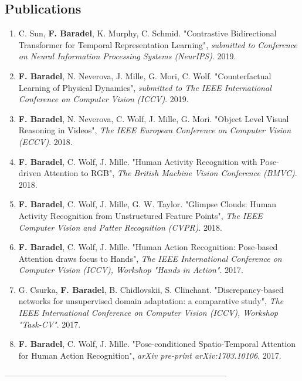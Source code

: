 \documentclass[10pt]{res} %
\begin{document}
\begin{resume}
\section{\large Publications} 
\begin{enumerate}[wide=0pt]
	\item C. Sun, \textbf{F. Baradel}, K. Murphy, C. Schmid. "Contrastive Bidirectional Transformer for Temporal Representation Learning", \textit{submitted to Conference on Neural Information Processing Systems (NeurIPS)}. 2019.
	\item \textbf{F. Baradel}, N. Neverova, J. Mille, G. Mori, C. Wolf. "Counterfactual Learning of Physical Dynamics", \textit{submitted to The IEEE International Conference on Computer Vision (ICCV)}. 2019.%
	\item \textbf{F. Baradel}, N. Neverova, C. Wolf, J. Mille, G. Mori. "Object Level Visual Reasoning in Videos", \textit{The IEEE European Conference on Computer Vision (ECCV)}. 2018.%
	\item \textbf{F. Baradel}, C. Wolf, J. Mille. "Human Activity Recognition with Pose-driven Attention to RGB", \textit{The British Machine Vision Conference (BMVC)}. 2018.%
	\item \textbf{F. Baradel}, C. Wolf, J. Mille, G. W. Taylor. "Glimpse Clouds: Human Activity Recognition from Unstructured Feature Points", \textit{The IEEE Computer Vision and Patter Recognition (CVPR)}. 2018.%
	\item \textbf{F. Baradel}, C. Wolf, J. Mille. "Human Action Recognition: Pose-based Attention draws focus to Hands", \textit{The IEEE International Conference on Computer Vision (ICCV), Workshop "Hands in Action"}. 2017.%
	\item G. Csurka, \textbf{F. Baradel}, B. Chidlovskii, S. Clinchant. "Discrepancy-based networks for unsupervised domain adaptation: a comparative study",  \textit{The IEEE International Conference on Computer Vision (ICCV), Workshop "Task-CV"}. 2017.%
	\item \textbf{F. Baradel}, C. Wolf, J. Mille. "Pose-conditioned Spatio-Temporal Attention for Human Action Recognition",  \textit{arXiv pre-print arXiv:1703.10106}. 2017.%
\end{enumerate}
---------------------------------------------------------------------------------



\end{resume}
\end{document}
